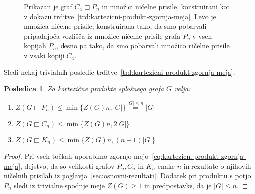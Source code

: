 \documentclass[12pt,a4paper,twoside]{article}
\theoremstyle{definition} %
\theoremstyle{plain} %
\newtheorem{posledica}[definicija]{Posledica}
\numberwithin{equation}{section}  %
\DeclareMathOperator{\boxempty}{\Box}
\begin{document}
\begin{figure}[h]
\begin{subfigure}{0.49\textwidth}
    \end{subfigure}
    \caption{Prikazan je graf $C_4 \boxempty P_n$ in množici ničelne prisile, konstruirani kot v dokazu trditve~\ref{trd:kartezicni-produkt-zgornja-meja}. Levo je množica ničelne prisile, konstruirana tako, da smo pobarvali pripadajoča vozlišča iz množice ničelne prisile grafa $P_n$ v vseh kopijah $P_n$, desno pa tako, da smo pobarvali množico ničelne prisile v vsaki kopiji $C_4$.}
    \label{fig:zf-kartezicni-produkt}
\end{figure}

Sledi nekaj trivialnih posledic trditve~\ref{trd:kartezicni-produkt-zgornja-meja}.
\begin{posledica}
    Za kartezične produkte splošnega grafa $G$ velja:
    \begin{enumerate}
        \item $Z(G \boxempty P_n) \leq \min \{ Z(G)n, |G| \} \stackrel{|G| \leq n}{=} |G|$
        \item $Z(G \boxempty C_n) \leq \min \{ Z(G)n, 2|G| \}$
        \item $Z(G \boxempty K_n) \leq \min \{ Z(G)n, (n-1)|G| \}$
    \end{enumerate}
\end{posledica}
\begin{proof}
    Pri vseh točkah uporabimo zgornjo mejo~\eqref{eq:kartezicni-produkt-zgornja-meja}, dejstvo, da so velikosti grafov $P_n, C_n$ in $K_n$ enake $n$ in rezultate o njihovih ničelnih prisilah iz poglavja~\ref{sec:osnovni-rezultati}. Dodatek pri produktu s potjo $P_n$ sledi iz trivialne spodnje meje $Z(G) \geq 1$ in predpostavke, da je $|G| \leq n$. 
\end{proof}
\end{document}
